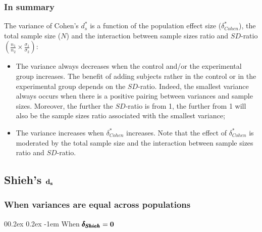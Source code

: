 \documentclass[
  english,
  man,mask]{apa6}
\makeatletter
\providecommand{\tightlist}{%
  \setlength{\itemsep}{0pt}\setlength{\parskip}{0pt}}
\let\oldparagraph\paragraph
\renewcommand{\paragraph}[1]{\oldparagraph{#1}\mbox{}}
\renewcommand{\paragraph}{\@startsection{paragraph}{4}{\parindent}%
  {0\baselineskip \@plus 0.2ex \@minus 0.2ex}%
  {-1em}%
  {\normalfont\normalsize\bfseries\itshape\typesectitle}}
\makeatother
\begin{document}
\hypertarget{in-summary-2}{%
\subsubsection{In summary}\label{in-summary-2}}

The variance of Cohen's \(d^*_s\) is a function of the population effect size (\(\delta^*_{Cohen}\)), the total sample size (\(N\)) and the interaction between sample sizes ratio and \(SD\)-ratio \(\left(\frac{n_1}{n_2}\times\frac{\sigma_1}{\sigma_2} \right)\):

\begin{itemize}
\tightlist
\item
  The variance always decreases when the control and/or the experimental group increases. The benefit of adding subjects rather in the control or in the experimental group depends on the \(SD\)-ratio. Indeed, the smallest variance always occurs when there is a positive pairing between variances and sample sizes. Moreover, the further the \(SD\)-ratio is from 1, the further from 1 will also be the sample sizes ratio associated with the smallest variance;\\
\item
  The variance increases when \(\delta^*_{Cohen}\) increases. Note that the effect of \(\delta^*_{Cohen}\) is moderated by the total sample size and the interaction between sample sizes ratio and \(SD\)-ratio.
\end{itemize}

\hypertarget{shiehs-bf-d_s}{%
\subsection{\texorpdfstring{Shieh's \(\bf d_s\)}{Shieh's \textbackslash bf d\_s}}\label{shiehs-bf-d_s}}

\hypertarget{when-variances-are-equal-across-populations-3}{%
\subsubsection{When variances are equal across populations}\label{when-variances-are-equal-across-populations-3}}

\hypertarget{when-bf-pmbdelta_shieh0}{%
\paragraph{\texorpdfstring{When \(\bf \pmb{\delta_{Shieh}}=0\)}{When \textbackslash bf \textbackslash pmb\{\textbackslash delta\_\{Shieh\}\}=0}}\label{when-bf-pmbdelta_shieh0}}
\end{document}
